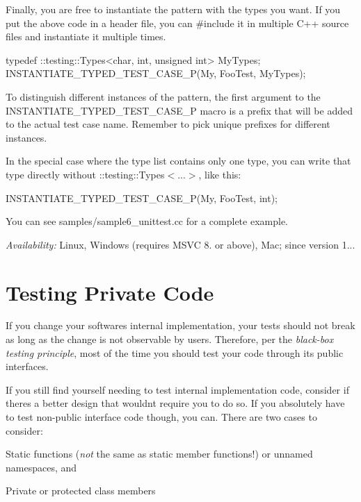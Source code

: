 Finally, you are free to instantiate the pattern with the types you want. If you put the above code in a header file, you can {\ttfamily \#include} it in multiple C++ source files and instantiate it multiple times.


\begin{DoxyCode}
typedef ::testing::Types<char, int, unsigned int> MyTypes;
INSTANTIATE\_TYPED\_TEST\_CASE\_P(My, FooTest, MyTypes);
\end{DoxyCode}


To distinguish different instances of the pattern, the first argument to the {\ttfamily I\+N\+S\+T\+A\+N\+T\+I\+A\+T\+E\+\_\+\+T\+Y\+P\+E\+D\+\_\+\+T\+E\+S\+T\+\_\+\+C\+A\+S\+E\+\_\+P} macro is a prefix that will be added to the actual test case name. Remember to pick unique prefixes for different instances.

In the special case where the type list contains only one type, you can write that type directly without {\ttfamily \+::testing\+::\+Types$<$...$>$}, like this\+:


\begin{DoxyCode}
INSTANTIATE\_TYPED\_TEST\_CASE\_P(My, FooTest, int);
\end{DoxyCode}


You can see {\ttfamily samples/sample6\+\_\+unittest.\+cc} for a complete example.

{\itshape Availability\+:} Linux, Windows (requires M\+S\+VC 8. or above), Mac; since version 1...

\section*{Testing Private Code}

If you change your software\textquotesingle{}s internal implementation, your tests should not break as long as the change is not observable by users. Therefore, per the {\itshape black-\/box testing principle}, most of the time you should test your code through its public interfaces.

If you still find yourself needing to test internal implementation code, consider if there\textquotesingle{}s a better design that wouldn\textquotesingle{}t require you to do so. If you absolutely have to test non-\/public interface code though, you can. There are two cases to consider\+:


\begin{DoxyItemize}
\item Static functions ({\itshape not} the same as static member functions!) or unnamed namespaces, and
\item Private or protected class members
\end{DoxyItemize}

